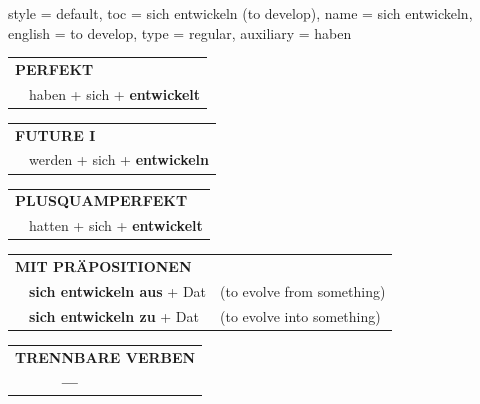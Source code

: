 \begin{verbentry}{
  style = {default},
  toc = {sich entwickeln (to develop)},
  name = {sich entwickeln},
  english = {to develop},
  type = {regular},
  auxiliary = {haben}
}
 \begin{tabular}{rl}
     \multicolumn{2}{l}{\textbf{PERFEKT}}\\
    &haben + sich + \textbf{entwickelt}\\
  \end{tabular}
\hfill
   \begin{tabular}{rl}
   
    \multicolumn{2}{l}{\textbf{FUTURE I} }\\
    &werden + sich + \textbf{entwickeln}\\
 
  \end{tabular}
\hfill
   \begin{tabular}{rl}
      \multicolumn{2}{l}{\textbf{PLUSQUAMPERFEKT}}\\
    &hatten + sich + \textbf{entwickelt}\\
  \end{tabular}
  
\vspace{10pt}

   \begin{tabular}{lll}
      \multicolumn{3}{l}{\textbf{MIT PRÄPOSITIONEN}}\\
& \textbf{sich entwickeln aus} + Dat & (to evolve from something)\\
& \textbf{sich entwickeln zu} + Dat & (to evolve into something)
  \end{tabular}
  \hfill
   \begin{tabular}{lll}
\multicolumn{3}{l}{\textbf{TRENNBARE VERBEN}}\\
& \textbf{---} & \\
\end{tabular}
  
  \vspace{-5pt}
\end{verbentry}

